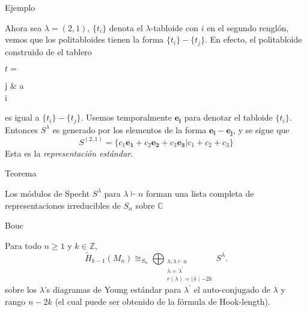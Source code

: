 \documentclass[final,xcolor=svgnames]{beamer}
\begin{document}
\begin{frame}{}
\begin{columns}
\begin{column}{0.5\textwidth}
\begin{block}{Ejemplo}
\begin{scriptsize}
         Ahora sea $\lambda=(2,1)$, $\{t_{i}\}$ denota el $\lambda$-tabloide
         con $i$ en el segundo renglón, vemos que los politabloides tienen la
         forma  $\{t_{i}\}- \{t_{j}\}$. En efecto, el politabloide construido
         de el tablero
         \begin{center}$t=$
           \begin{ytableau}
             j & a \\
             i\\
           \end{ytableau}
         \end{center}
         es igual a $\{t_{i}\}- \{t_{j}\}$. Usemos temporalmente
         $\boldsymbol{e_{i}}$ para denotar el tabloide $\{t_{i}\}$. Entonces
         $S^{\lambda}$ es generado por los elementos de la forma
         $\boldsymbol{e_{i}}-\boldsymbol{e_{j}}$, y se sigue que
         $$S^{(2,1)}=\{c_{1}\boldsymbol{e_{1}}+c_{2}\boldsymbol{e_{2}}+c_{3}\boldsymbol{e_{3}}|c_{1}+c_{2}+c_{3}\}$$ 
         Esta es la \textit{representación estándar}. 
       \end{scriptsize}
     \end{block}

     \begin{block}{Teorema}
       \begin{scriptsize}         
         Los módulos de Specht $S^{\lambda}$ para $\lambda\vdash n$ forman
         una lista completa de representaciones irreducibles de $S_{n}$ sobre $\mathbb{C}$
        \end{scriptsize}
      \end{block}

      \begin{block}{Bouc}
        \begin{scriptsize}
          Para todo $n\geq1$ y $k\in \mathbb{Z}$,
          \begin{equation*}
            \widetilde H_{k-1}(M_{n})\cong_{S_{n}}\bigoplus_{\substack{\lambda:\lambda\vdash n\\
              \lambda=\lambda^{'}\\r(\lambda)=\mid \lambda \mid-2k}} S^{\lambda}.
          \end{equation*}
          sobre los $\lambda$'s diagramas de Young estándar para $\lambda^{'}$
          el auto-conjugado de $\lambda$ y rango $n-2k$ (el cual puede ser
          obtenido de la fórmula de Hook-length).
        \end{scriptsize}
      \end{block}
    \end{column}
  \end{columns}


\end{frame}
\end{document}
